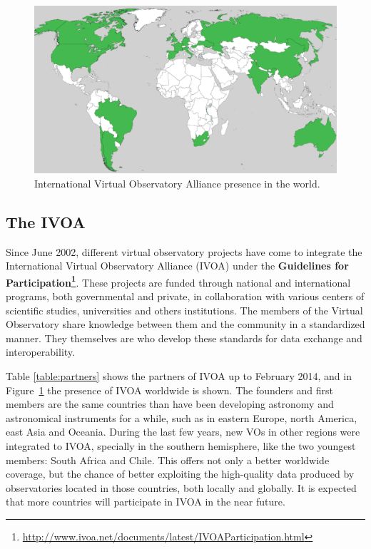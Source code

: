 \normalsize

\begin{figure}%
\begin{center}
	\includegraphics[width=0.9\linewidth]{img/VO-worldwide.png}
	\caption{International Virtual Observatory Alliance presence in the world.}
\end{center}
\label{figure:worldview}
\end{figure}

\subsection{The IVOA}

Since June 2002, different virtual observatory projects have come to integrate the
International Virtual Observatory Alliance (IVOA) under the \textbf{Guidelines
for Participation\footnote{\url{http://www.ivoa.net/documents/latest/IVOAParticipation.html}}}. 
These projects are funded through national and international programs, both governmental and 
private, in collaboration with various centers of scientific studies, universities and
others institutions. The members of the Virtual Observatory share
knowledge between them and the community in a standardized manner. They
themselves are who develop these standards for data exchange and
interoperability. 


Table \ref{table:partners} shows the partners of IVOA up to
February 2014, and in Figure~\ref{figure:worldview} the presence of IVOA 
worldwide is shown. The founders and first members are the same countries than have
been developing astronomy and astronomical instruments for a while, such as in eastern
Europe, north America, east Asia and Oceania. During the last few years,
new VOs in other regions were integrated to IVOA, specially in the southern
hemisphere, like the two youngest members: South Africa and Chile. 
This offers not only a better worldwide coverage, but the chance of
better exploiting the high-quality data produced by observatories 
located in those countries, both locally and globally. It is expected that
more countries will participate in IVOA in the near future.


